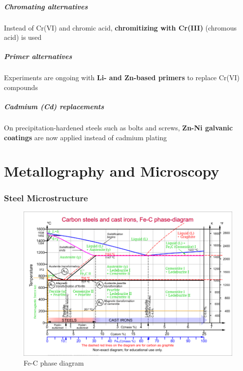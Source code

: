 \documentclass{article}
\begin{document}
\subsubsection{Chromating alternatives}
Instead of Cr(VI) and chromic acid, \textbf{chromitizing with Cr(III)} (chromous acid) is used

\subsubsection{Primer alternatives}
Experiments are ongoing with \textbf{Li- and Zn-based primers} to replace Cr(VI) compounds

\subsubsection{Cadmium (Cd) replacements}
On precipitation-hardened steels such as bolts and screws, \textbf{Zn-Ni galvanic coatings}
are now applied instead of cadmium plating

\newpage
\part{Metallography and Microscopy}
\section{Steel Microstructure}


\begin{figure}[ht!]
  \centering
  \includegraphics[width=\textwidth]{media/FeC-phase-diagram--multilingual.png}
  \caption*{Fe-C phase diagram}
\end{figure}
\end{document}
